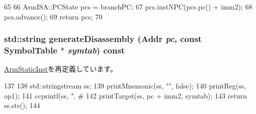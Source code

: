 \begin{DoxyCode}
65 {
66     ArmISA::PCState pcs = branchPC;
67     pcs.instNPC(pcs.pc() + imm2);
68     pcs.advance();
69     return pcs;
70 }
\end{DoxyCode}
\hypertarget{classArmISA_1_1BranchImmImmReg64_a95d323a22a5f07e14d6b4c9385a91896}{
\subsubsection[{generateDisassembly}]{\setlength{\rightskip}{0pt plus 5cm}std::string generateDisassembly ({\bf Addr} {\em pc}, \/  const SymbolTable $\ast$ {\em symtab}) const}}
\label{classArmISA_1_1BranchImmImmReg64_a95d323a22a5f07e14d6b4c9385a91896}


\hyperlink{classArmISA_1_1ArmStaticInst_a95d323a22a5f07e14d6b4c9385a91896}{ArmStaticInst}を再定義しています。


\begin{DoxyCode}
137 {
138     std::stringstream ss;
139     printMnemonic(ss, "", false);
140     printReg(ss, op1);
141     ccprintf(ss, ", #%
142     printTarget(ss, pc + imm2, symtab);
143     return ss.str();
144 }
\end{DoxyCode}


